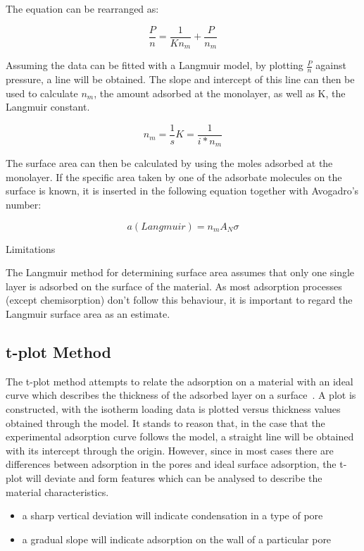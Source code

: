 The equation can be rearranged as:

\begin{equation}
	\frac{P}{n} = \frac{1}{K n_m} + \frac{P}{n_m}
\end{equation}

Assuming the data can be fitted with a Langmuir model, by plotting
\(\frac{P}{n}\) against pressure, a line will be obtained. The slope and
intercept of this line can then be used to calculate \(n_{m}\),
the amount adsorbed at the monolayer, as well as K, the Langmuir constant.

\begin{equation}
	n_m = \frac{1}{s}
	K = \frac{1}{i * n_m}
\end{equation}


The surface area can then be calculated by using the moles adsorbed at the
monolayer. If the specific area taken by one of the adsorbate molecules on
the surface is known, it is inserted in the following equation together with Avogadro's number:

\begin{equation}
	a(Langmuir) = n_m A_N \sigma
\end{equation}


Limitations

The Langmuir method for determining surface area assumes that only one single
layer is adsorbed on the surface of the material. As most adsorption processes
(except chemisorption) don't follow this behaviour, it is important to regard
the Langmuir surface area as an estimate.

\subsection{t-plot Method}

The t-plot method attempts to relate the adsorption on a material
with an ideal curve which describes the thickness of the adsorbed
layer on a surface~\cite{lippensStudiesPoreSystems1965}. 
A plot is constructed, with the isotherm loading
data is plotted versus thickness values obtained through the model.
It stands to reason that, in the case that the experimental adsorption
curve follows the model, a straight line will be obtained with its
intercept through the origin. However, since in most cases there
are differences between adsorption in the pores and ideal surface
adsorption, the t-plot will deviate and form features which can
be analysed to describe the material characteristics.

\begin{itemize}

	\item a sharp vertical deviation will indicate condensation
	      in a type of pore
	\item a gradual slope will indicate adsorption on the
	      wall of a particular pore

\end{itemize}

